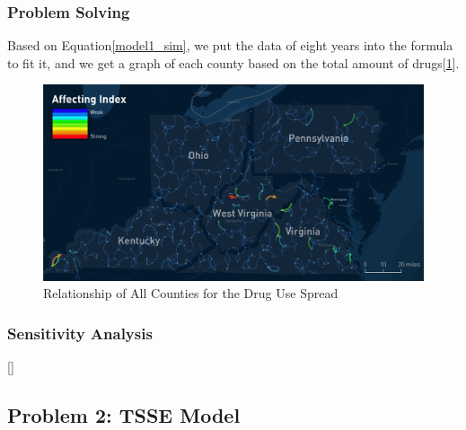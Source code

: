 \documentclass{mcmthesis}
\begin{document}
\subsubsection{Problem Solving}
Based on Equation\eqref{model1_sim}, we put the data of eight years into the formula to fit it, and we get a graph of each county based on the total amount of drugs[\ref{all_relation}].
\begin{figure}[ht]
	\centering
	\includegraphics[width=15cm]{figure-release/Model1.FlowMap.png}
	\caption{Relationship of All Counties for the Drug Use Spread}\label{all_relation}
\end{figure}



\subsubsection{Sensitivity Analysis}
[\cite{6}]
\subsection{Problem 2: TSSE Model}
\end{document}
